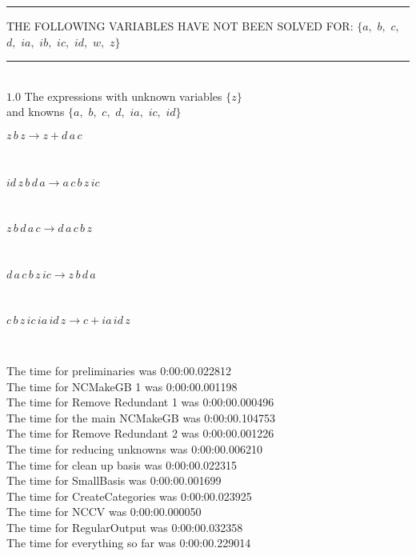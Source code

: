 \documentclass[rep10,leqno]{report}
\begin{document}
\rule[2pt]{6in}{4pt}\hfil\break
THE FOLLOWING VARIABLES HAVE NOT BEEN SOLVED FOR:\hfil\break
$\{a,
$ $
b,
$ $
c,
$ $
d,
$ $
ia,
$ $
ib,
$ $
ic,
$ $
id,
$ $
w,
$ $
z\}$
\smallskip\\
\rule[3pt]{6in}{.7pt}\\
$1.0$  The expressions with unknown variables $\{z\}$\\
and knowns $\{a,
$ $
b,
$ $
c,
$ $
d,
$ $
ia,
$ $
ic,
$ $
id\}$\smallskip\\
\begin{minipage}{6in}
$
z\,
 b\,
 z\rightarrow z + d\,
 a\,
 c
$
\end{minipage}\medskip \\
\begin{minipage}{6in}
$
id\,
 z\,
 b\,
 d\,
 a\rightarrow a\,
 c\,
 b\,
 z\,
 ic
$
\end{minipage}\medskip \\
\begin{minipage}{6in}
$
z\,
 b\,
 d\,
 a\,
 c\rightarrow d\,
 a\,
 c\,
 b\,
 z
$
\end{minipage}\medskip \\
\begin{minipage}{6in}
$
d\,
 a\,
 c\,
 b\,
 z\,
 ic\rightarrow z\,
 b\,
 d\,
 a
$
\end{minipage}\medskip \\
\begin{minipage}{6in}
$
c\,
 b\,
 z\,
 ic\,
 ia\,
 id\,
 z\rightarrow c + ia\,
 id\,
 z
$
\end{minipage}\\
\vspace{10pt}

\noindent
The time for preliminaries was 0:00:00.022812\\
The time for NCMakeGB 1 was 0:00:00.001198\\
The time for Remove Redundant 1 was 0:00:00.000496\\
The time for the main NCMakeGB was 0:00:00.104753\\
The time for Remove Redundant 2 was 0:00:00.001226\\
The time for reducing unknowns was 0:00:00.006210\\
The time for clean up basis was 0:00:00.022315\\
The time for SmallBasis was 0:00:00.001699\\
The time for CreateCategories was 0:00:00.023925\\
The time for NCCV was 0:00:00.000050\\
The time for RegularOutput was 0:00:00.032358\\
The time for everything so far was 0:00:00.229014\\
\end{document}
